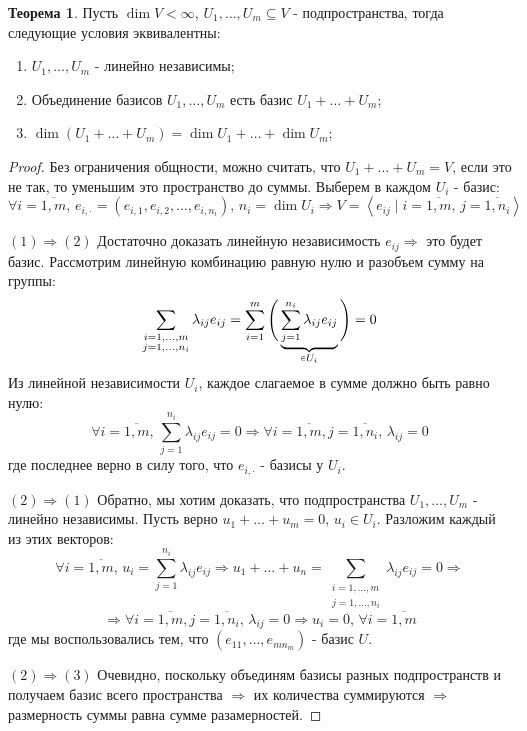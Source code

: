 \documentclass[12pt]{article}
\theoremstyle{definition}
\newtheorem{theorem}{Теорема}
\newcommand{\ddsum}[2]{\displaystyle\sum\limits_{#1}^{#2}}
\newcommand{\smallerrel}[1]{\mathrel{\mathpalette\smallerrelaux{#1}}}
\newcommand{\smallerrelaux}[2]{\raisebox{.1ex}{\scalebox{.75}{$#1#2$}}}
\newcommand{\smallin}{\smallerrel{\in}}
\newcommand{\linsp}[1]{\left\langle #1 \right\rangle }
\begin{document}
\begin{theorem}
	Пусть $\dim{V} < \infty$, $U_1, \dotsc, U_m \subseteq V$  - подпространства, тогда следующие условия эквивалентны:
	\begin{enumerate}[label=(\arabic*)]
		\item $U_1,\dotsc, U_m$ - линейно независимы;
		\item Объединение базисов $U_1, \dotsc, U_m$ есть базис $U_1 + \dotsc + U_m$;
		\item $\dim{(U_1 + \dotsc + U_m)} = \dim{U_1} + \dotsc + \dim{U_m}$;
	\end{enumerate}
\end{theorem}
\begin{proof}
	Без ограничения общности, можно считать, что $U_1 + \dotsc + U_m = V$, если это не так, то уменьшим это пространство до суммы. Выберем в каждом $U_i$ - базис:
	$$
		\forall i = \overline{1,m}, \, e_{i,\cdot} = (e_{i,1}, e_{i,2}, \dotsc, e_{i, n_i}), \, n_i = \dim{U_i} \Rightarrow V = \linsp{e_{ij} \mid i = \overline{1,m},\, j = \overline{1,n_i}}
	$$
	
	$(1) \Rightarrow (2)$ Достаточно доказать линейную независимость $e_{ij} \Rightarrow$ это будет базис. Рассмотрим линейную комбинацию равную нулю и разобъем сумму на группы:
	$$
		\ddsum{\substack{i = 1,\dotsc,m\\j = 1,\dotsc, n_i}}{}\lambda_{ij} e_{ij} = \ddsum{i = 1}{m}\Bigg(\underbrace{\ddsum{j = 1}{n_i}\lambda_{ij}e_{ij}}_{\smallin U_i}\Bigg) = 0 
	$$
	Из линейной независимости $U_i$, каждое слагаемое в сумме должно быть равно нулю:
	$$
		\forall i = \overline{1,m}, \, \ddsum{j = 1}{n_i}\lambda_{ij}e_{ij} = 0 \Rightarrow \forall i = \overline{1,m}, j = \overline{1,n_i}, \, \lambda_{ij} = 0
	$$
	где последнее верно в силу того, что $e_{i,\cdot}$ - базисы у $U_i$.
	
	$(2) \Rightarrow (1)$ Обратно, мы хотим доказать, что подпространства $U_1, \dotsc, U_m$ - линейно независимы. Пусть верно $u_1 + \dotsc + u_m = 0, \, u_i \in U_i$. Разложим каждый из этих векторов:
	$$
		\forall i = \overline{1,m}, \, u_i = \ddsum{j = 1}{n_i}\lambda_{ij}e_{ij}  \Rightarrow u_1 + \dotsc + u_n = \ddsum{\substack{i = 1,\dotsc,m\\j = 1,\dotsc, n_i}}{}\lambda_{ij} e_{ij} = 0 \Rightarrow 
	$$
	$$
		\Rightarrow \forall i = \overline{1,m}, j = \overline{1,n_i}, \, \lambda_{ij} = 0 \Rightarrow u_i = 0, \, \forall i =\overline{1,m}
	$$
	где мы воспользовались тем, что $(e_{11}, \dotsc, e_{mn_m})$ - базис $U$.
	
	$(2) \Rightarrow (3)$ Очевидно, поскольку объединям базисы разных подпространств и получаем базис всего пространства $\Rightarrow$ их количества суммируются $\Rightarrow$ размерность суммы равна сумме разамерностей.
	

\end{proof}
\end{document}
